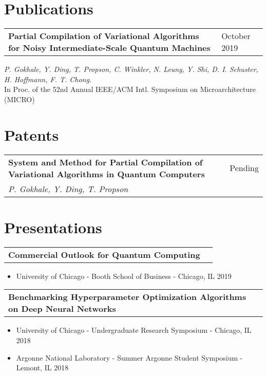 \documentclass[letterpaper, 12pt]{article}
\begin{document}
\pagebreak
\section{Publications}
\vspace{10pt}
\begin{tabular}{@{} L{12cm} @{} R{4.51cm} @{}}
  \textbf{Partial Compilation of Variational Algorithms for Noisy Intermediate-Scale Quantum Machines} & October 2019 \\
\end{tabular}
  \textit{P. Gokhale, Y. Ding, T. Propson, C. Winkler, N. Leung, Y. Shi, D. I. Schuster, H. Hoffmann, F. T. Chong.}\\
  In Proc. of the 52nd Annual IEEE/ACM Intl. Symposium on Microarchitecture (MICRO)\\

\vspace{10pt}
\section{Patents}
\vspace{5pt}
\begin{tabular}{@{} L{12cm} @{} R{4.51cm} @{}}
  \textbf{System and Method for Partial Compilation of Variational Algorithms in Quantum Computers}
  & Pending \\
  \textit{P. Gokhale, Y. Ding, T. Propson}\\
\end{tabular}

\vspace{10pt}
\section{Presentations}
\vspace{5pt}
\begin{tabular}{@{} L{12cm} @{} R{4.51cm} @{}}
  \textbf{Commercial Outlook for Quantum Computing} & \\
\end{tabular}
\vspace{-20pt}
\begin{itemize}
  \item University of Chicago - Booth School of Business - Chicago, IL 2019
\end{itemize}

\begin{tabular}{@{} L{12cm} @{} R{4.51cm} @{}}
  \textbf{Benchmarking Hyperparameter Optimization Algorithms on Deep Neural Networks} & \\
\end{tabular}
\vspace{-10pt}
\begin{itemize}
  \item University of Chicago - Undergraduate Research Symposium - Chicago, IL 2018\\
  \item Argonne National Laboratory - Summer Argonne Student Symposium - Lemont, IL 2018\\
\end{itemize}
\end{document}
